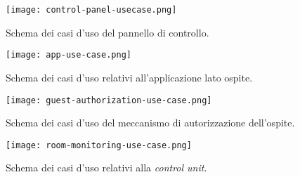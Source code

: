 \begin{figure}[H]
    \texttt{[image: control-panel-usecase.png]}
    \centering
    \caption[control-panel-usecase]{Schema dei casi d'uso del pannello di controllo.}
    \label{fig:cp-usecase}
\end{figure}

\begin{figure}[H]
    \texttt{[image: app-use-case.png]}
    \centering
    \caption[app-usecase]{Schema dei casi d'uso relativi all'applicazione lato ospite.}
    \label{fig:app-usecase}
\end{figure}

\begin{figure}[H]
    \texttt{[image: guest-authorization-use-case.png]}
    \centering
    \caption[guest-authorization-usecase]{Schema dei casi d'uso del meccanismo di autorizzazione dell'ospite.}
    \label{fig:guest-authorization-usecase}
\end{figure}

\begin{figure}[H]
    \texttt{[image: room-monitoring-use-case.png]}
    \centering
    \caption[room-monitoring-usecase]{Schema dei casi d'uso relativi alla \textit{control unit}.}
    \label{fig:room-monitoring-usecase}
\end{figure}


